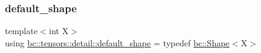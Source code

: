 \mbox{\label{namespacebc_1_1tensors_1_1detail_aea990a08131aca54e30c234f68b18c73}} 
\subsubsection{\texorpdfstring{default\+\_\+shape}{default\_shape}}
{\footnotesize\ttfamily template$<$int X$>$ \\
using \hyperlink{namespacebc_1_1tensors_1_1detail_aea990a08131aca54e30c234f68b18c73}{bc\+::tensors\+::detail\+::default\+\_\+shape} = typedef \hyperlink{structbc_1_1Shape}{bc\+::\+Shape}$<$X$>$}

